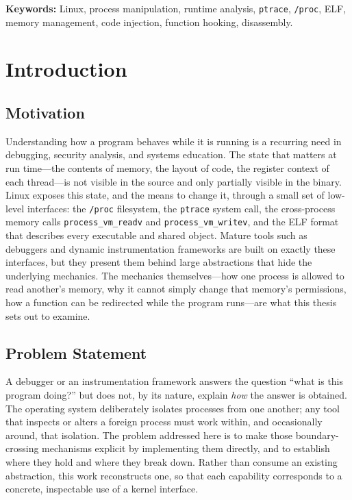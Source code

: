 \documentclass[10pt,twocolumn,a4paper]{article}
\begin{document}
\vspace{0.5cm}
\noindent\textbf{Keywords:} Linux, process manipulation, runtime analysis,
\texttt{ptrace}, \texttt{/proc}, ELF, memory management, code injection,
function hooking, disassembly.

\vspace{1em}
\tableofcontents
\twocolumn

\section{Introduction}

\subsection{Motivation}
Understanding how a program behaves while it is running is a recurring need in
debugging, security analysis, and systems education. The state that matters at
run time---the contents of memory, the layout of code, the register context of
each thread---is not visible in the source and only partially visible in the
binary. Linux exposes this state, and the means to change it, through a small
set of low-level interfaces: the \texttt{/proc} filesystem, the \texttt{ptrace}
system call, the cross-process memory calls \texttt{process\_vm\_readv} and
\texttt{process\_vm\_writev}, and the ELF format that describes every
executable and shared object. Mature tools such as debuggers and dynamic
instrumentation frameworks are built on exactly these interfaces, but they
present them behind large abstractions that hide the underlying mechanics. The
mechanics themselves---how one process is allowed to read another's memory, why
it cannot simply change that memory's permissions, how a function can be
redirected while the program runs---are what this thesis sets out to examine.

\subsection{Problem Statement}
A debugger or an instrumentation framework answers the question ``what is this
program doing?'' but does not, by its nature, explain \emph{how} the answer is
obtained. The operating system deliberately isolates processes from one
another; any tool that inspects or alters a foreign process must work within,
and occasionally around, that isolation. The problem addressed here is to make
those boundary-crossing mechanisms explicit by implementing them directly,
and to establish where they hold and where they break down. Rather than
consume an existing abstraction, this work reconstructs one, so that each
capability corresponds to a concrete, inspectable use of a kernel interface.
\end{document}

